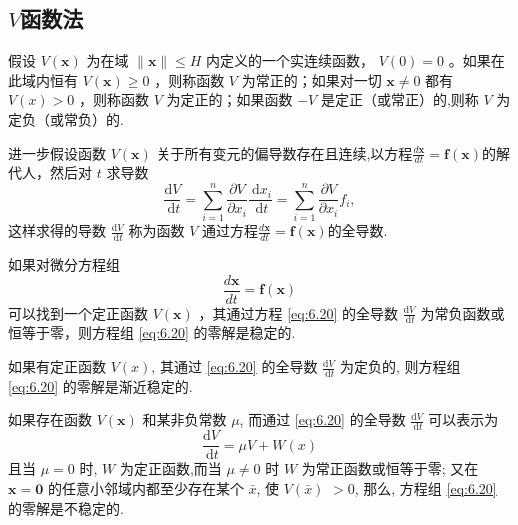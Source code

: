 \subsection{$V$函数法}

\begin{definition}
    假设 $V(\boldsymbol{x})$ 为在域 $\|\boldsymbol{x}\| \leqslant H$ 内定义的一个实连续函数， $V(0)=0$ 。如果在此域内恒有 $V(\boldsymbol{x}) \geqslant 0$ ，则称函数 $V$ 为常正的；如果对一切 $\boldsymbol{x} \neq 0$ 都有 $V(x)>0$ ，则称函数 $V$ 为定正的；如果函数 $-V$ 是定正（或常正）的,则称 $V$ 为定负（或常负）的.
\end{definition}
进一步假设函数 $V(\boldsymbol{x})$ 关于所有变元的偏导数存在且连续,以方程$\frac{d\mathbf{x}}{dt}=\mathbf{f}(\mathbf{x})$的解代人，然后对 $t$ 求导数
$$
    \frac{\mathrm{d} V}{\mathrm{~d} t}=\sum_{i=1}^n \frac{\partial V}{\partial x_i} \frac{\mathrm{~d} x_i}{\mathrm{~d} t}=\sum_{i=1}^n \frac{\partial V}{\partial x_i} f_i,
$$
这样求得的导数 $\frac{\mathrm{d} V}{\mathrm{~d} t}$ 称为函数 $V$ 通过方程$\frac{d\mathbf{x}}{dt}=\mathbf{f}(\mathbf{x})$的全导数.

\begin{theorem}
    如果对微分方程组
    \begin{equation}\label{eq:6.20}
        \frac{d\mathbf{x}}{dt} = \mathbf{f}(\mathbf{x})
    \end{equation}
    可以找到一个定正函数 $V(\boldsymbol{x})$ ，其通过方程 \eqref{eq:6.20} 的全导数 $\frac{\mathrm{d} V}{\mathrm{~d} t}$ 为常负函数或恒等于零，则方程组 \eqref{eq:6.20} 的零解是稳定的.

    如果有定正函数 $V(x)$, 其通过 \eqref{eq:6.20} 的全导数 $\frac{\mathrm{d} V}{\mathrm{~d} t}$ 为定负的, 则方程组 \eqref{eq:6.20} 的零解是渐近稳定的.

    如果存在函数 $V(\boldsymbol{x})$ 和某非负常数 $\mu$, 而通过 \eqref{eq:6.20} 的全导数 $\frac{\mathrm{d} V}{\mathrm{~d} t}$ 可以表示为
    $$
        \frac{\mathrm{d} V}{\mathrm{~d} t}=\mu V+W(x)
    $$
    且当 $\mu=0$ 时, $W$ 为定正函数,而当 $\mu \neq 0$ 时 $W$ 为常正函数或恒等于零; 又在 $\boldsymbol{x}=\mathbf{0}$ 的任意小邻域内都至少存在某个 $\bar{x}$, 使 $V(\bar{x})$ $>0$, 那么, 方程组 \eqref{eq:6.20} 的零解是不稳定的.
\end{theorem}

